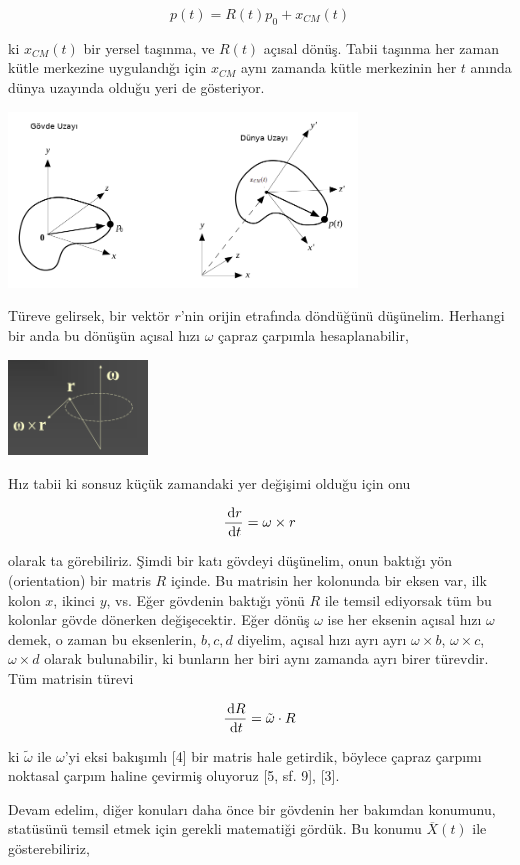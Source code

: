 \documentclass[12pt,fleqn]{article}\usepackage{../../common}
\begin{document}
$$
p(t) = R(t) p_0 + x_{CM}(t)
$$

ki $x_{CM}(t)$ bir yersel taşınma, ve $R(t)$ açısal dönüş. Tabii taşınma her
zaman kütle merkezine uygulandığı için $x_{CM}$ aynı zamanda kütle merkezinin
her $t$ anında dünya uzayında olduğu yeri de gösteriyor.

\includegraphics[width=25em]{phy_005_basics_04_04.png}

Türeve gelirsek, bir vektör $r$'nin orijin etrafında döndüğünü
düşünelim. Herhangi bir anda bu dönüşün açısal hızı $\omega$ çapraz çarpımla
hesaplanabilir,

\includegraphics[width=10em]{phy_005_basics_04_03.png}

Hız tabii ki sonsuz küçük zamandaki yer değişimi olduğu için onu

$$
\frac{\,\mathrm{d} r}{\,\mathrm{d} t} = \omega \times r
$$

olarak ta görebiliriz. Şimdi bir katı gövdeyi düşünelim, onun baktığı yön
(orientation) bir matris $R$ içinde. Bu matrisin her kolonunda bir eksen var,
ilk kolon $x$, ikinci $y$, vs. Eğer gövdenin baktığı yönü $R$ ile temsil
ediyorsak tüm bu kolonlar gövde dönerken değişecektir. Eğer dönüş $\omega$ ise
her eksenin açısal hızı $\omega$ demek, o zaman bu eksenlerin, $b,c,d$ diyelim,
açısal hızı ayrı ayrı $\omega \times b$, $\omega \times c$, $\omega \times d$
olarak bulunabilir, ki bunların her biri aynı zamanda ayrı birer türevdir. Tüm
matrisin türevi

$$
\frac{\,\mathrm{d} R}{\,\mathrm{d} t} = \tilde \omega \cdot R
$$

ki $\tilde \omega$ ile $\omega$'yi eksi bakışımlı [4] bir matris hale getirdik,
böylece çapraz çarpımı noktasal çarpım haline çevirmiş oluyoruz [5, sf. 9], [3].

Devam edelim, diğer konuları daha önce bir gövdenin her bakımdan konumunu,
statüsünü temsil etmek için gerekli matematiği gördük. Bu konumu
$\overline{X}(t)$ ile gösterebiliriz,
\end{document}
